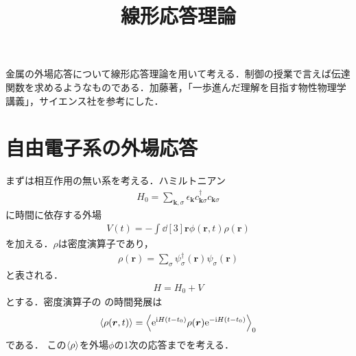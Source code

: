 \documentclass{ltjarticle}
\begin{document}
\title{線形応答理論}
\maketitle
金属の外場応答について線形応答理論を用いて考える．制御の授業で言えば伝達関数を求めるようなものである．加藤著，「一歩進んだ理解を目指す物性物理学講義」，サイエンス社を参考にした．
\section{自由電子系の外場応答}
まずは相互作用の無い系を考える．ハミルトニアン
\begin{align}
  H_0 = \sum_{\bm{k},\sigma} \epsilon_{\bm{k}}c_{\bm{k}\sigma}^{\dagger}c_{\bm{k}\sigma} \label{eq:free-electron}
\end{align}
に時間に依存する外場
\begin{align}
  V(t) = -\int \dd[3]{\bm{r}} \phi(\bm{r},t)\rho(\bm{r})
\end{align}
を加える．$\rho$は密度演算子であり，
\begin{align}
  \rho(\bm{r}) = \sum_{\sigma} \psi_{\sigma}^{\dagger}(\bm{r})\psi_{\sigma}(\bm{r})
\end{align}
と表される．
\begin{align}
  H = H_0 + V
\end{align}
とする．密度演算子の
の時間発展は
\begin{align}
  \ev{\rho(\bm{r},t)} = \ev{\e^{\i H(t-t_0) }\rho(\bm{r})\e^{-\i H (t-t_0)}}_0
\end{align}
である．
この$\ev{\rho}$を外場$\phi$の1次の応答までを考える．
\end{document}
